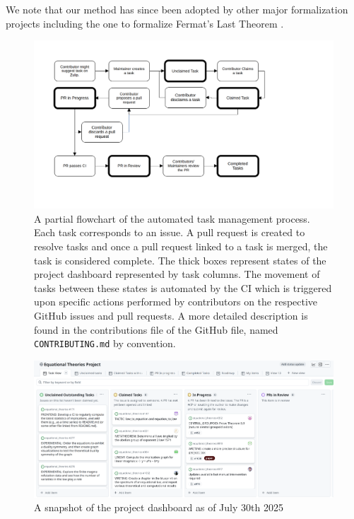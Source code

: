 We note that our method has since been adopted by other major formalization projects including the one to formalize Fermat's Last Theorem \cite{FLT_Lean}.
\begin{figure}[t]
    \centering
    \includegraphics[width=1.0\textwidth]{proj_mgmt_figures/task_flowchart.png}
    \caption{\label{fig:proj_mgmt_flow} A partial flowchart of the automated task management process. Each task corresponds to an issue. A pull request is created to resolve tasks and once a pull request linked to a task is merged, the task is considered complete. The thick boxes represent states of the project dashboard represented by task columns. The movement of tasks between these states is automated by the CI which is triggered upon specific actions performed by contributors on the respective GitHub issues and pull requests. A more detailed description is found in the contributions file of the GitHub file, named\texttt{ CONTRIBUTING.md} by convention.}
\end{figure}

\begin{figure}[t]
    \centering
    \includegraphics[width=1.0\textwidth]{proj_mgmt_figures/proj_dash_snapshot.png}
    \caption{\label{fig:proj_dashboard} A snapshot of the project dashboard as of July 30th 2025}
\end{figure}
